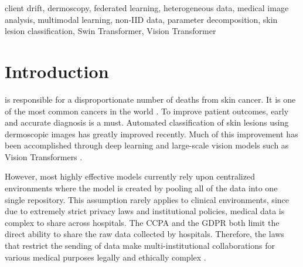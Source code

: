 \documentclass{ieeeaccess}
\begin{document}
\begin{abstract}
inter-client standard deviation by approximately 39\%; centralized training on the same split reached 0.8867 balanced accuracy as a reference ceiling. We report that validation split is contaminated by same-lesion duplicates and quantify this in the paper, which is why the claims above rest on the held-out collection and on within-split differences rather than on absolute validation figures. These proof-of-concept results suggest improved class coverage, stability and fairness for multimodal Vision Transformer models in federated medical imaging, within the tested scope of three federated configurations on a single dataset.
\end{abstract}

\begin{keywords}
client drift, dermoscopy, federated learning, heterogeneous data, medical image analysis, multimodal learning, non-IID data, parameter decomposition, skin lesion classification, Swin Transformer, Vision Transformer
\end{keywords}

\titlepgskip=-15pt

\maketitle

\section{Introduction}
\label{sec:introduction}
 is responsible for a disproportionate number of deaths from skin cancer. It is one of the most common cancers in the world \cite{Arnold2022,Hay2014}. To improve patient outcomes, early and accurate diagnosis is a must. Automated classification of skin lesions using dermoscopic images has greatly improved recently. Much of this improvement has been accomplished through deep learning and large-scale vision models such as Vision Transformers \cite{Aguirre2024}.

However, most highly effective models currently rely upon centralized environments where the model is created by pooling all of the data into one single repository. This assumption rarely applies to clinical environments, since due to extremely strict privacy laws and institutional policies, medical data is complex to share across hospitals. The CCPA and the GDPR both limit the direct ability to share the raw data collected by hospitals. Therefore, the laws that restrict the sending of data make multi-institutional collaborations for various medical purposes legally and ethically complex \cite{Voigt2017,Law2023}.
\end{document}
